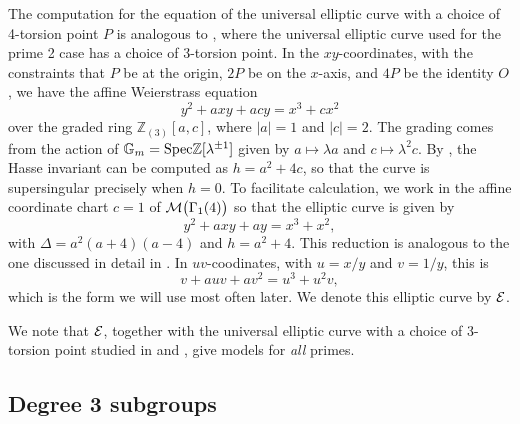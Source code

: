 \documentclass{gtpart}
\theoremstyle{definition}
\theoremstyle{remark}
\newcommand{\mb}[1]{\mathbb{#1}}
\newcommand{\Spec}{{\rm Spec}}
\newcommand{\Gm}{{{\mb G}_m}}
\begin{document}
The computation for the equation of the universal elliptic curve with 
a choice of 4-torsion point $P$ is analogous to 
\cite[proposition 3.2]{tmf3}, where the universal elliptic curve used for the prime 2 
case has a choice of 3-torsion point.  In the $xy$-coordinates, 
with the constraints that $P$ be at the origin, $2P$ be on the 
$x$-axis, and $4P$ be the identity $O$, we have the affine Weierstrass 
equation 
\[
 y^2 + a x y + a c y = x^3 + c x^2
\]
over the graded ring ${\mb Z}_{(3)}[a,c]$, where $|a| = 1$ and $|c| = 2$.  
The grading comes from the action of $\Gm = \Spec {\mb Z}[\lambda^{\pm1}]$ 
given by $a \mapsto \lambda a$ and $c \mapsto \lambda^2 c$.  By 
\cite[theorem 4.1(a)]{AEC}, the Hasse invariant can be computed as 
$h = a^2 + 4c$, so that the curve is supersingular precisely when $h = 0$.  To facilitate 
calculation, we work in the affine coordinate chart $c = 1$ of 
${\cal M}\big(\Gamma_1(4)\big)$ so that the elliptic curve is given by 
\[
 y^2 + a x y + a y = x^3 + x^2,
\]
with $\Delta = a^2(a + 4)(a - 4)$ and $h = a^2 + 4$.  This reduction is analogous to the one 
discussed in detail in \cite[section 4]{level3}.  In $uv$-coodinates, with 
$u = x/y$ and $v = 1/y$, this is 
\[
 v + a u v + a v^2 = u^3 + u^2 v,
\]
which is the form we will use most often later.  We denote this elliptic curve by $\cal E$.  

We note that $\cal E$, together with the universal elliptic curve with a choice of 3-torsion point studied in \cite{tmf3} and \cite{h2p2}, give models 
for {\em all} primes.  


\subsection{Degree 3 subgroups}
\label{subsec:step2}
\end{document}
